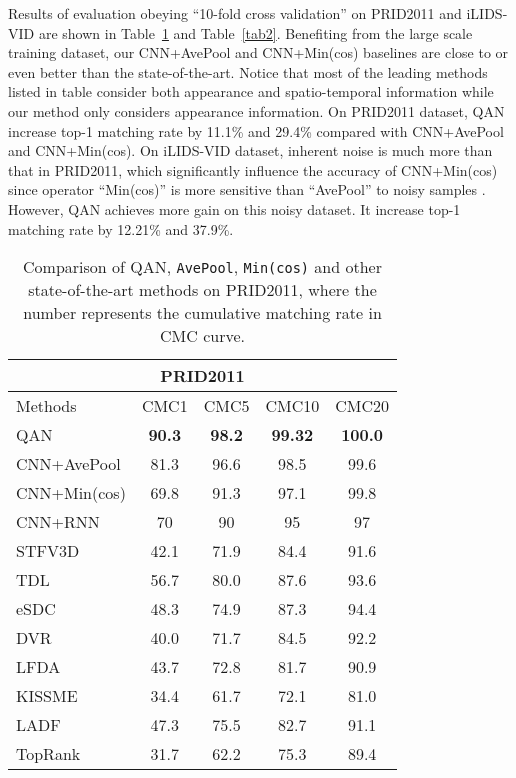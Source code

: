 \documentclass[10pt,twocolumn,letterpaper]{article}
\begin{document}
Results of evaluation obeying ``10-fold cross validation'' on  PRID2011 and iLIDS-VID are shown in Table~\ref{tab1} and Table~\ref{tab2}. Benefiting from the large scale training dataset, our CNN+AvePool and CNN+Min(cos) baselines are close to or even better than the state-of-the-art. Notice that most of the leading methods listed in table consider both appearance and spatio-temporal information while our method only considers appearance information. On PRID2011 dataset, QAN increase  top-1 matching rate by 11.1\% and 29.4\% compared with CNN+AvePool and CNN+Min(cos). On iLIDS-VID dataset, inherent noise is much more than that in PRID2011, which significantly influence the accuracy of CNN+Min(cos) since operator ``Min(cos)'' is more sensitive than ``AvePool'' to noisy samples . However, QAN achieves more gain on this noisy dataset. It increase top-1 matching rate by 12.21\% and 37.9\%. 

\begin{table}[!htb]
\normalsize
\centering
  \begin{tabular}{l|c|c|c|c}
\hline
      \multicolumn{5}{c}{PRID2011}\\
\hline
       Methods & CMC1 &CMC5&CMC10 & CMC20 \\
\hline
       QAN 	& \textbf{90.3} & \textbf{98.2} & \textbf{99.32} & \textbf{100.0}  \\
       CNN+AvePool 		& 81.3 & 96.6 & 98.5 & 99.6 \\
       CNN+Min(cos) 		& 69.8 & 91.3 & 97.1 & 99.8  \\
\hline
       CNN+RNN\cite{wu2016deep} & 70 & 90 & 95 & 97  \\
       STFV3D\cite{liu2015spatio} & 42.1 & 71.9 & 84.4 & 91.6 \\
       TDL\cite{you2016top} 				& 56.7 & 80.0 & 87.6 & 93.6 \\
       eSDC\cite{wang2016person} 	& 48.3 & 74.9 & 87.3 & 94.4  \\
       DVR\cite{wang2016person} 	& 40.0 & 71.7 & 84.5 & 92.2 \\
       LFDA\cite{pedagadi2013local}	& 43.7 & 72.8 & 81.7 & 90.9  \\
       KISSME\cite{koestinger2012large}	& 34.4 & 61.7 & 72.1 & 81.0  \\
       LADF\cite{li2013learning} 				& 47.3 & 75.5 & 82.7 & 91.1 \\
       TopRank\cite{li2014top} 			& 31.7 & 62.2 & 75.3 & 89.4  \\
\hline
  \end{tabular}
  \caption{Comparison of QAN, \texttt{AvePool}, \texttt{Min(cos)} and other state-of-the-art methods on PRID2011, where the number represents the cumulative matching rate in CMC curve.}
\label{tab1}
\end{table}
\end{document}
